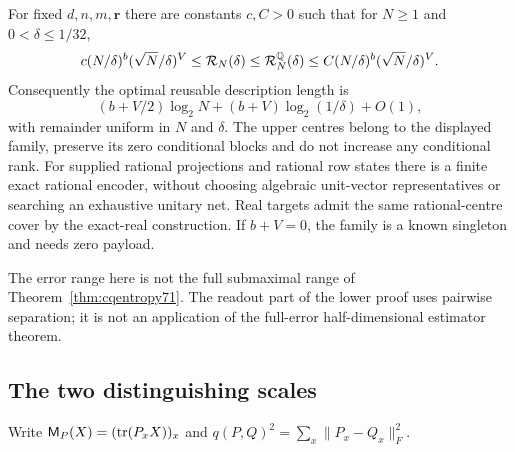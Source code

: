 \begin{theorem}\label{thm:readoutentropy72}
For fixed $d,n,m,\boldsymbol r$ there are constants $c,C>0$ such that
for $N\ge1$ and $0<\delta\le1/32$,
\begin{equation}\label{eq:readoutcover72}
 c(N/\delta)^b(\sqrt N/\delta)^V
 \le\mathcal R_N(\delta)
 \le\mathcal R_N^{\mathbb Q}(\delta)
 \le C(N/\delta)^b(\sqrt N/\delta)^V.
\end{equation}
Consequently the optimal reusable description length is
\begin{equation}\label{eq:readoutbits72}
 (b+V/2)\log_2N+(b+V)\log_2(1/\delta)+O(1),
\end{equation}
with remainder uniform in $N$ and $\delta$. The upper centres belong
to the displayed family, preserve its zero conditional blocks and do
not increase any conditional rank. For supplied rational projections
and rational row states there is a finite exact rational encoder,
without choosing algebraic unit-vector representatives or searching
an exhaustive unitary net. Real targets admit the same rational-centre
cover by the exact-real construction. If $b+V=0$, the family is a
known singleton and needs zero payload.
\end{theorem}
The error range here is not the full submaximal range of
Theorem~\ref{thm:cqentropy71}. The readout part of the lower proof uses
pairwise separation; it is not an application of the full-error
half-dimensional estimator theorem.

\subsection{The two distinguishing scales}
Write $\mathsf M_P(X)=(\operatorname{tr}(P_xX))_x$ and
$q(P,Q)^2=\sum_x\|P_x-Q_x\|_F^2$.

